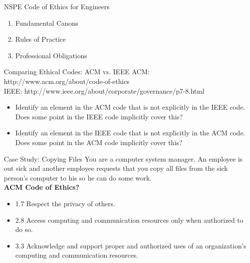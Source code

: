 \documentclass{beamer}
\begin{document}
\begin{frame}{NSPE Code of Ethics for Engineers \href{http://www.nspe.org/Ethics/CodeofEthics/index.html}{}}
\begin{enumerate}
\item Fundamental Canons
\item Rules of Practice
\item Professional Obligations
\end{enumerate}
\end{frame}

\begin{frame}{Comparing Ethical Codes: ACM vs. IEEE}
ACM: http://www.acm.org/about/code-of-ethics \\
IEEE: http://www.ieee.org/about/corporate/governance/p7-8.html
\bigskip
\begin{itemize}
\item Identify an element in the ACM code that is not explicitly in the IEEE code. Does some point in the IEEE code implicitly cover this?
\item Identify an element in the IEEE code that is not explicitly in the ACM code. Does some point in the ACM code implicitly cover this?
\end{itemize}
\end{frame}

\begin{frame}{Case Study: Copying Files}
You are a computer system manager. An employee is out sick and another employee requests that you copy all files from the sick person's computer to his so he can do some work. \\
\bigskip
\textbf{ACM Code of Ethics?}
\begin{itemize}
\item<2-> 1.7 Respect the privacy of others.
\item<2-> 2.8 Access computing and communication resources only when authorized to do so.
\item<2-> 3.3 Acknowledge and support proper and authorized uses of an organization's computing and communication resources.
\end{itemize}
\end{frame}
\end{document}

